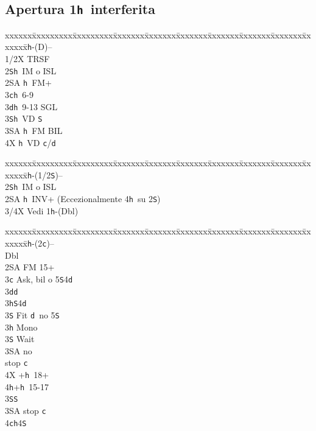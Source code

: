 \documentclass[a4paper,italian]{article}
\newcommand{\BS}{\small{\texttt{S}}}
\newcommand{\BC}{\small{\texttt{c}}}
\newcommand{\BD}{\small{\texttt{d}}}
\newcommand{\BH}{\small{\texttt{h}}}
\newcommand{\pdfh}{\texorpdfstring{\texttt{h}}{H}}
\newenvironment{bidtable}
{\begin{tabbing}

    xxxxxx\=xxxxxxxxx\=xxxxxxxxx\=xxxxxxx\=xxxxxxx\=xxxxxxx\=xxxxxxx\=xxxxxxx\=xxxxxxx\=xxxxxxx\=\kill}
{\end{tabbing} }%
\begin{document}
\begin{multicols}{2}

    \subsection{Apertura 1\pdfh\ interferita}

    \begin{bidtable}
        1\BH-(D)--\+\\
        1/2X \> TRSF\\
        2\BS {}\BH\ IM o ISL\\
        2\small{SA} \BH\ FM+\\
        3\BC {}\BH\ 6-9\\
        3\BD {}\BH\ 9-13 SGL\\
        3\BS {}\BH\ VD \BS \\
        3\small{SA} \BH\ FM BIL\\
        4X \BH\ VD \BC /\BD \-
    \end{bidtable}
    \bigbreak
    \begin{bidtable}
        1\BH-(1/2\BS)--\+\\
        2\BS {}\BH\ IM o ISL\\
        2\small{SA} \BH\ INV+ (Eccezionalmente 4\BH\ su 2\BS )\\
        3/4X \> Vedi 1\BH -(Dbl)\-
    \end{bidtable}
    \bigbreak
    \begin{bidtable}
        1\BH-(2\BC)--\+\\
        Dbl\+\\
        2\small{SA} \> FM 15+\+\\
        3\BC \> Ask, bil o 5\BS4\BD\+\\
        3\BD {}\BD \+\\
        3\BH {}\BS 4\BD \\
        3\BS \> Fit \BD\ no 5\BS \-\\
        3\BH \> Mono\+\\
        3\BS \> Wait\+\\
        3\small{SA}  no\+\\ stop \BC \-\\
        4X +\BH\ 18+\\
        4\BH {}+\BH\ 15-17\-\-\\
        3\BS {}\BS \\
        3\small{SA}  stop \BC \\
        4\BC {}\BH 4\BS \-\\

\end{bidtable}
\end{multicols}
\end{document}
